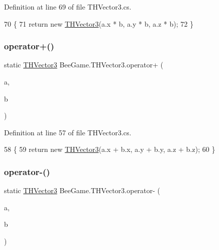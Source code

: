 Definition at line 69 of file T\+H\+Vector3.\+cs.


\begin{DoxyCode}
70         \{
71             \textcolor{keywordflow}{return} \textcolor{keyword}{new} \hyperlink{struct_bee_game_1_1_t_h_vector3_ad1b3467b019ea95fc114536aab566fb4}{THVector3}(a.x * b, a.y * b, a.z * b);
72         \}
\end{DoxyCode}
\mbox{\label{struct_bee_game_1_1_t_h_vector3_a49eda0cb0ef9880dbcc9a60eaede8738}} 
\subsubsection{\texorpdfstring{operator+()}{operator+()}}
{\footnotesize\ttfamily static \hyperlink{struct_bee_game_1_1_t_h_vector3}{T\+H\+Vector3} Bee\+Game.\+T\+H\+Vector3.\+operator+ (\begin{DoxyParamCaption}\item[{\hyperlink{struct_bee_game_1_1_t_h_vector3}{T\+H\+Vector3}}]{a,  }\item[{\hyperlink{struct_bee_game_1_1_t_h_vector3}{T\+H\+Vector3}}]{b }\end{DoxyParamCaption})\hspace{0.3cm}{\ttfamily [static]}}



Definition at line 57 of file T\+H\+Vector3.\+cs.


\begin{DoxyCode}
58         \{
59             \textcolor{keywordflow}{return} \textcolor{keyword}{new} \hyperlink{struct_bee_game_1_1_t_h_vector3_ad1b3467b019ea95fc114536aab566fb4}{THVector3}(a.x + b.x, a.y + b.y, a.z + b.z);
60         \}
\end{DoxyCode}
\mbox{\label{struct_bee_game_1_1_t_h_vector3_a036ff2d81d5be5ebbff5fe88555b6c79}} 
\subsubsection{\texorpdfstring{operator-\/()}{operator-()}}
{\footnotesize\ttfamily static \hyperlink{struct_bee_game_1_1_t_h_vector3}{T\+H\+Vector3} Bee\+Game.\+T\+H\+Vector3.\+operator-\/ (\begin{DoxyParamCaption}\item[{\hyperlink{struct_bee_game_1_1_t_h_vector3}{T\+H\+Vector3}}]{a,  }\item[{\hyperlink{struct_bee_game_1_1_t_h_vector3}{T\+H\+Vector3}}]{b }\end{DoxyParamCaption})\hspace{0.3cm}{\ttfamily [static]}}



